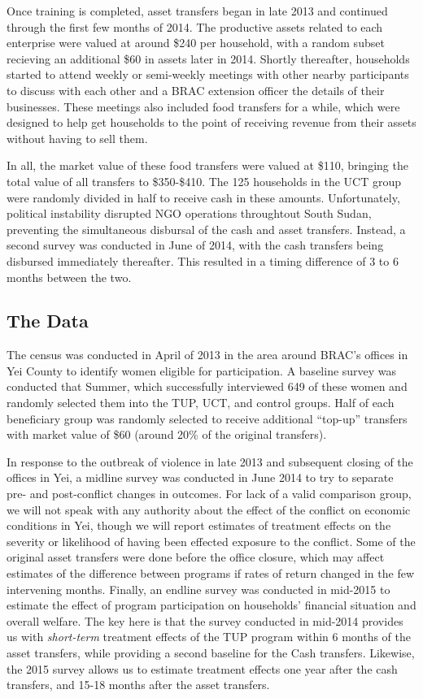 \documentclass[12pt,article]{article}
\begin{document}
Once training is completed, asset transfers began in late 2013 and continued through
the first few months of 2014. The productive assets related to each enterprise were
valued at around \$240 per household, with a random subset recieving an additional \$60
in assets later in 2014. Shortly thereafter, households started to attend weekly or
semi-weekly meetings with other nearby participants to discuss with each other and a
BRAC extension officer the details of their businesses. These meetings also included
food transfers for a while, which were designed to help get households to the point
of receiving revenue from their assets without having to sell them.

In all, the market value of these food transfers were valued at \$110, bringing the
total value of all transfers to \$350-\$410. The 125 households in the UCT group were
randomly divided in half to receive cash in these amounts. Unfortunately, political
instability disrupted NGO operations throughtout South Sudan, preventing the
simultaneous disbursal of the cash and asset transfers. Instead, a second survey was
conducted in June of 2014, with the cash transfers being disbursed immediately
thereafter. This resulted in a timing difference of 3 to 6 months between the two.

\subsection*{The Data}
\label{sec-2-1}

The census was conducted in April of 2013 in the area around BRAC's offices in Yei
County to identify women eligible for participation. A baseline survey was conducted
that Summer, which successfully interviewed 649 of these women and randomly selected
them into the TUP, UCT, and control groups. Half of each beneficiary group was
randomly selected to receive additional ``top-up'' transfers with market value of \$60
(around 20\% of the original transfers).

In response to the outbreak of violence in late 2013 and subsequent closing of the
offices in Yei, a midline survey was conducted in June 2014 to try to separate pre-
and post-conflict changes in outcomes. For lack of a valid comparison group, we will
not speak with any authority about the effect of the conflict on economic conditions
in Yei, though we will report estimates of treatment effects on the severity or
likelihood of having been effected exposure to the conflict. Some of the original
asset transfers were done before the office closure, which may affect estimates of
the difference between programs if rates of return changed in the few intervening
months. Finally, an endline survey was conducted in mid-2015 to estimate the effect
of program participation on households' financial situation and overall welfare. The
key here is that the survey conducted in mid-2014 provides us with \emph{short-term}
treatment effects of the TUP program within 6 months of the asset transfers, while
providing a second baseline for the Cash transfers. Likewise, the 2015 survey
allows us to estimate treatment effects one year after the cash transfers, and 15-18
months after the asset transfers.
\end{document}
